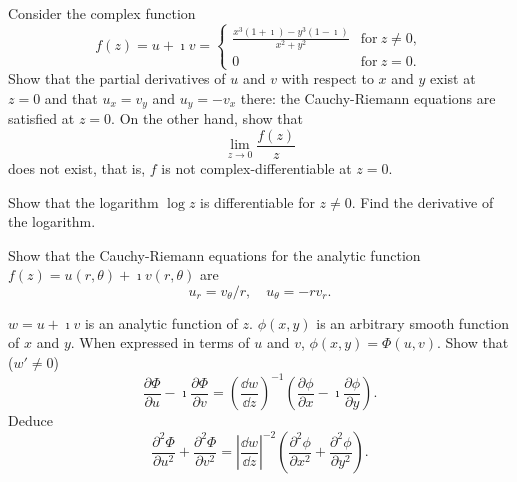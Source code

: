 {%
\begin{Exercise}
  \label{exercise C-R x31iy31i}
  Consider the complex function 
  \[
  f(z) = u + \imath v = 
  \begin{cases}
    \frac{x^3 (1 + \imath) - y^3 (1 - \imath)}{x^2 + y^2} &\mathrm{for}\ z \neq 0, 
    \\
    0 &\mathrm{for}\ z= 0.
  \end{cases}
  \]
  Show that the partial derivatives of $u$ and $v$ with respect to $x$
  and $y$ exist at $z = 0$ and that $u_x = v_y$ and $u_y = -v_x$ there: the
  Cauchy-Riemann equations are satisfied at $z = 0$. On the other hand,
  show that
  \[
  \lim_{z \to 0} \frac{f(z)}{z}
  \]
  does not exist, that is, $f$ is not complex-differentiable at $z = 0$.

\end{Exercise}








\begin{Exercise}
  \label{exercise diff log}
  Show that the logarithm $\log z$ is differentiable for $z \neq 0$.
  Find the derivative of the logarithm.

\end{Exercise}









\begin{Exercise}
  \label{exercise diff polar coords}
  Show that the Cauchy-Riemann equations for the analytic function 
  $f(z) = u(r, \theta) + \imath v(r, \theta)$ are
  \[
  u_r = v_\theta / r, \quad u_\theta = - r v_r.
  \]

\end{Exercise}









\begin{Exercise}
  \label{exercise w=u+iv is analytic}
  $w = u + \imath v$ is an analytic function of $z$.  $\phi(x, y)$ is an
  arbitrary smooth function of $x$ and $y$.  When expressed in terms of 
  $u$ and $v$, $\phi(x, y) = \Phi(u, v)$.  Show that ($w' \neq 0$)
  \[
  \frac{\partial \Phi}{\partial u} - \imath  \frac{\partial \Phi}{\partial v} = 
  \left( \frac{\dd w}{\dd z} \right)^{-1} 
  \left( \frac{\partial \phi}{\partial x} - \imath  \frac{\partial \phi}{\partial y} \right).
  \]
  Deduce
  \[
  \frac{\partial^2 \Phi}{\partial u^2} + \frac{\partial^2 \Phi}{\partial v^2} =
  \left| \frac{\dd w}{\dd z} \right|^{-2} 
  \left( \frac{\partial^2 \phi}{\partial x^2} + \frac{\partial^2 \phi}{\partial y^2} \right).
  \]


\end{Exercise}}
